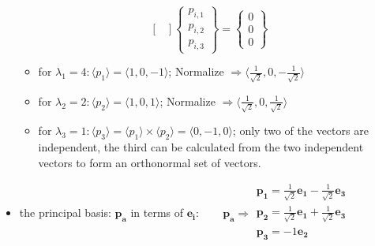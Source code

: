 \documentclass[10pt, letterpaper]{article}
\begin{document}
\begin{itemize}
\begin{equation*}
\begin{bmatrix}
			\end{bmatrix}  \begin{Bmatrix} p_{i,1} \\ p_{i,2} \\ p_{i,3} \end{Bmatrix} = 
			\begin{Bmatrix} 0 \\ 0 \\ 0 \end{Bmatrix} \end{equation*}
			\begin{itemize}
     				\item for $\lambda_1 = 4: \langle p_1 \rangle = \langle1, 0, -1 \rangle$; Normalize $\Rightarrow 
					\langle \frac{1}{\sqrt{2}}, 0, -\frac{1}{\sqrt{2}} \rangle$
  				
				\item for $\lambda_2 = 2: \langle p_2 \rangle = \langle1, 0, 1 \rangle$; Normalize $ \Rightarrow 
					\langle \frac{1}{\sqrt{2}}, 0, \frac{1}{\sqrt{2}} \rangle$
				
				\item for $\lambda_3 = 1:  \langle p_3 \rangle=\langle p_1\rangle \times 
					\langle p_2 \rangle = \langle 0, -1, 0 \rangle$; 
					only two of the vectors are independent, the third can be calculated from 
					the two independent vectors to form an orthonormal set of vectors.
			\end{itemize}
			\item the principal basis:  $\bm{p_a} $ in terms of $\bm{e_i}: \qquad \bm{p_a} \Rightarrow \begin{matrix}
				\bm{p_1} = \frac{1}{\sqrt{2}} \bm{e_1}  - \frac{1}{\sqrt{2}}  \bm{e_3} \\
				\bm{p_2} = \frac{1}{\sqrt{2}} \bm{e_1}  + \frac{1}{\sqrt{2}}  \bm{e_3} \\
				\bm{p_3} = -1 \bm{e_2}  \\
				\end{matrix}$
	\end{itemize}

\end{document}
